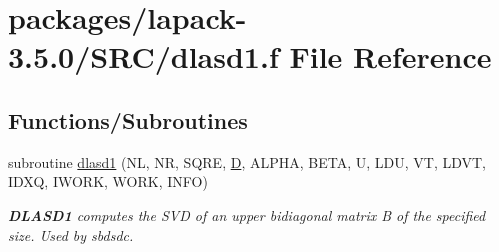 \hypertarget{dlasd1_8f}{}\section{packages/lapack-\/3.5.0/\+S\+R\+C/dlasd1.f File Reference}
\label{dlasd1_8f}
\subsection*{Functions/\+Subroutines}
\begin{DoxyCompactItemize}
\item 
subroutine \hyperlink{group__auxOTHERauxiliary_gae73e96812a1bfc42d43c9697971c82a6}{dlasd1} (N\+L, N\+R, S\+Q\+R\+E, \hyperlink{odrpack_8h_a7dae6ea403d00f3687f24a874e67d139}{D}, A\+L\+P\+H\+A, B\+E\+T\+A, U, L\+D\+U, V\+T, L\+D\+V\+T, I\+D\+X\+Q, I\+W\+O\+R\+K, W\+O\+R\+K, I\+N\+F\+O)
\begin{DoxyCompactList}\small\item\em {\bfseries D\+L\+A\+S\+D1} computes the S\+V\+D of an upper bidiagonal matrix B of the specified size. Used by sbdsdc. \end{DoxyCompactList}\end{DoxyCompactItemize}
